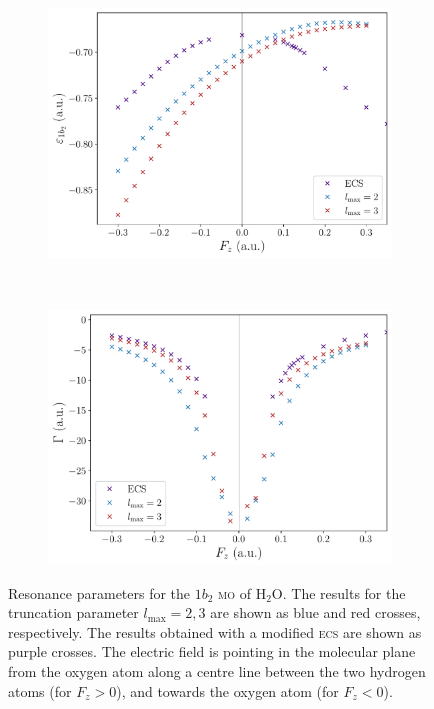 \begin{figure}
  \centering
  \begin{subfigure}[b]{0.45\linewidth}
    \centering
    \includegraphics[width=\textwidth]{figures/ch_H2O/partial_wave/Re1b2l23.pdf}
    \caption{}\label{fig:1b2_cap_re}
  \end{subfigure}
  \,
  \begin{subfigure}[b]{0.45\linewidth}
    \centering
    \includegraphics[width=\textwidth]{figures/ch_H2O/partial_wave/Im1b2l23.pdf}
    \caption{}\label{fig:1b2_cap_im}
  \end{subfigure}
  \caption{Resonance parameters for the $1b_{2}$ \textsc{mo} of
    H$_{2}$O. The results for the truncation parameter
    $l_{\mathrm{max}} = 2, 3$ are shown as blue and red crosses,
    respectively. The results obtained with a modified \textsc{ecs}
    are shown as purple crosses. The electric field is pointing in the
    molecular plane from the oxygen atom along a centre line between
    the two hydrogen atoms (for $F_{z} > 0$), and towards the oxygen
    atom (for $F_{z} < 0$).}
  \label{fig:1b2_cap}
\end{figure}

